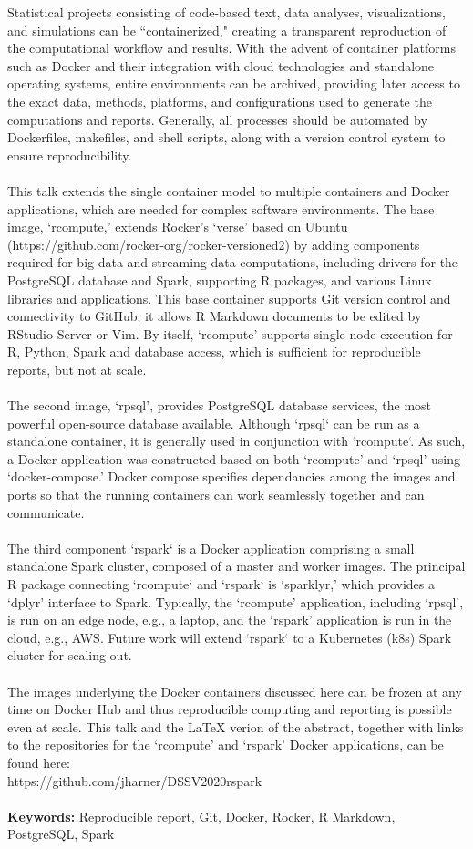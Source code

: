 Statistical projects consisting of code-based text, data analyses, visualizations, and simulations can be ``containerized," creating a transparent reproduction of the computational workflow and results. With the advent of container platforms such as Docker and their integration with cloud technologies and standalone operating systems, entire environments can be archived, providing later access to the exact data, methods, platforms, and configurations used to generate the computations and reports. Generally, all processes should be automated by Dockerfiles, makefiles, and shell scripts, along with a version control system to ensure reproducibility.\\
\\
This talk extends the single container model to multiple containers and Docker applications, which are needed for complex software environments. The base image, `rcompute,' extends Rocker's `verse' based on Ubuntu (https://github.com/rocker-org/rocker-versioned2) by adding components required for big data and streaming data computations, including drivers for the PostgreSQL database and Spark, supporting R packages, and various Linux libraries and applications. This base container supports Git version control and connectivity to GitHub; it allows R Markdown documents to be edited by RStudio Server or Vim. By itself, `rcompute' supports single node execution for R, Python, Spark and database access, which is sufficient for reproducible reports, but not at scale.\\
\\
The second image, `rpsql', provides PostgreSQL database services, the most powerful open-source database available. Although `rpsql` can be run as a standalone container, it is generally used in conjunction with `rcompute`. As such, a Docker application was constructed based on both `rcompute' and `rpsql' using `docker-compose.' Docker compose specifies dependancies among the images and ports so that the running containers can work seamlessly together and can communicate.\\
\\
The third component `rspark` is a Docker application comprising a small standalone Spark cluster, composed of a master and worker images. The principal R package connecting `rcompute` and `rspark` is `sparklyr,' which provides a `dplyr' interface to Spark. Typically, the `rcompute' application, including `rpsql', is run on an edge node, e.g., a laptop, and the `rspark' application is run in the cloud, e.g., AWS. Future work will extend `rspark` to a Kubernetes (k8s) Spark cluster for scaling out.\\
\\
The images underlying the Docker containers discussed here can be frozen at any time on Docker Hub and thus reproducible computing and reporting is possible even at scale. This talk and the LaTeX verion of the abstract, together with links to the repositories for the `rcompute' and `rspark' Docker applications, can be found here:\\ https://github.com/jharner/DSSV2020rspark\\
\\
\textbf{Keywords:} Reproducible report, Git, Docker, Rocker, R Markdown, PostgreSQL, Spark


